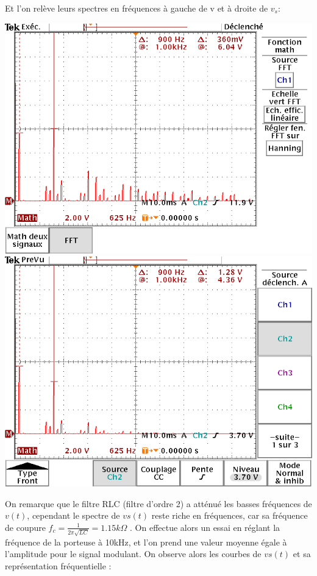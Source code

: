 \documentclass[10pt,a4paper]{article}
\begin{document}
	Et l'on relève leurs spectres en fréquences à gauche de v et à droite de $v_s$:
	\begin{center}
	\includegraphics[scale=0.3]{fft_v.png}
	\includegraphics[scale=0.3]{fft_vs.png}
	\end{center}
	On remarque que le filtre RLC (filtre d'ordre 2) a atténué les basses fréquences de $v(t)$, cependant le spectre de $vs(t)$  reste riche en fréquences, car sa fréquence de coupure $f_c=\frac{1}{2\pi\sqrt{LC}}=1.15 k\Omega$ . On effectue alors un essai en réglant la fréquence de la porteuse à 10kHz, et l'on prend une valeur moyenne égale à l'amplitude pour le signal modulant. On observe alors les courbes de $vs(t)$ et sa représentation fréquentielle :
\end{document}
